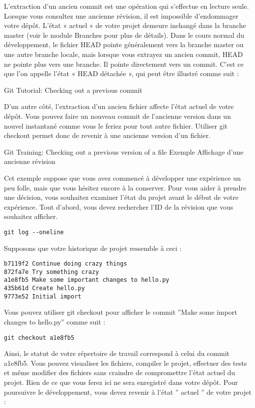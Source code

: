 \begin{itemize}
L'extraction d'un ancien commit est une opération qui s'effectue en lecture seule. Lorsque vous consultez une ancienne révision, il est impossible d'endommager votre dépôt. L'état « actuel » de votre projet demeure inchangé dans la branche master (voir le module Branches pour plus de détails). Dans le cours normal du développement, le fichier HEAD pointe généralement vers la branche master ou une autre branche locale, mais lorsque vous extrayez un ancien commit, HEAD ne pointe plus vers une branche. Il pointe directement vers un commit. C'est ce que l'on appelle l'état « HEAD détachée », qui peut être illustré comme suit :

Git Tutorial: Checking out a previous commit

D'un autre côté, l'extraction d'un ancien fichier affecte l'état actuel de votre dépôt. Vous pouvez faire un nouveau commit de l'ancienne version dans un nouvel instantané comme vous le feriez pour tout autre fichier. Utiliser git checkout permet donc de revenir à une ancienne version d'un fichier.

Git Training: Checking out a previous version of a file
Exemple
Affichage d'une ancienne révision

Cet exemple suppose que vous avez commencé à développer une expérience un peu folle, mais que vous hésitez encore à la conserver. Pour vous aider à prendre une décision, vous souhaitez examiner l'état du projet avant le début de votre expérience. Tout d'abord, vous devez rechercher l'ID de la révision que vous souhaitez afficher.

\begin{verbatim}
git log --oneline
\end{verbatim}

Supposons que votre historique de projet ressemble à ceci :

\begin{verbatim}
b7119f2 Continue doing crazy things
872fa7e Try something crazy
a1e8fb5 Make some important changes to hello.py
435b61d Create hello.py
9773e52 Initial import
\end{verbatim}

Vous pouvez utiliser git checkout pour afficher le commit ''Make some import changes to hello.py'' comme suit :

\begin{verbatim}
git checkout a1e8fb5
\end{verbatim}

Ainsi, le statut de votre répertoire de travail correspond à celui du commit a1e8fb5. Vous pouvez visualiser les fichiers, compiler le projet, effectuer des tests et même modifier des fichiers sans craindre de compromettre l'état actuel du projet. Rien de ce que vous ferez ici ne sera enregistré dans votre dépôt. Pour poursuivre le développement, vous devez revenir à l'\'etat '' actuel '' de votre projet :


\end{itemize}
